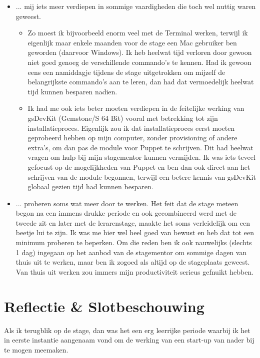 \documentclass[a4paper,11pt]{article}
\theoremstyle{definition}
\begin{document}
\begin{itemize}
  \item ... mij iets meer verdiepen in sommige vaardigheden die toch wel nuttig waren geweest. 
  \begin{itemize}
   \item Zo moest ik bijvoorbeeld enorm veel met de Terminal werken, terwijl ik eigenlijk maar enkele maanden voor
  de stage een Mac gebruiker ben geworden (daarvoor Windows). Ik heb heelwat tijd verloren door gewoon niet goed 
  genoeg de verschillende commando's te kennen. Had ik gewoon eens een 
  namiddagje tijdens de stage uitgetrokken om mijzelf de belangrijkste 
  commando's aan te leren, dan had dat vermoedelijk heelwat tijd kunnen besparen nadien.
  \item Ik had me ook iets beter moeten verdiepen in de feitelijke werking van 
 gsDevKit (Gemstone/S 64 Bit) vooral met betrekking tot zijn installatieproces.  Eigenlijk zou
  ik dat installatieproces eerst moeten geprobeerd hebben op mijn computer, zonder provisioning of andere extra's, om
  dan pas de module voor Puppet te schrijven. Dit had 
  heelwat vragen om hulp bij mijn stagementor kunnen vermijden. Ik was iets 
  teveel gefocust op de mogelijkheden van Puppet en ben dan ook direct aan het schrijven van de module begonnen, terwijl een betere kennis van 
  gsDevKit globaal gezien tijd had kunnen besparen.
 
  \end{itemize}
  
    \item ... proberen soms wat meer door te werken. Het feit dat de stage 
    meteen begon na een immens drukke periode en ook gecombineerd werd met de tweede zit en later met de lerarenstage, maakte het soms verleidelijk om 
    een beetje lui te zijn. Ik was me hier wel heel goed van bewust en heb dat tot een minimum proberen te beperken.
    Om die reden ben ik ook nauwelijks (slechts 1 dag) ingegaan op het aanbod van de stagementor om sommige dagen
    van thuis uit te werken, maar ben ik zogoed als altijd op de stageplaats geweest. 
    Van thuis uit werken zou immers mijn productiviteit serieus gefnuikt 
    hebben.
\end{itemize}
\newpage
\section{Reflectie \& Slotbeschouwing}
Als ik terugblik op de stage, dan was het een erg leerrijke periode waarbij ik 
het in eerste instantie aangenaam vond om de werking van een start-up van nader bij te mogen meemaken. 
\\
\end{document}
